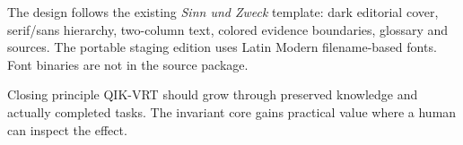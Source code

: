 \begin{cols}
The design follows the existing \emph{Sinn und Zweck} template: dark editorial cover, serif/sans hierarchy, two-column text, colored evidence boundaries, glossary and sources. The portable staging edition uses Latin Modern filename-based fonts. Font binaries are not in the source package.

\begin{boundary}{Closing principle}
QIK-VRT should grow through preserved knowledge and actually completed tasks. The invariant core gains practical value where a human can inspect the effect.
\end{boundary}
\end{cols}
